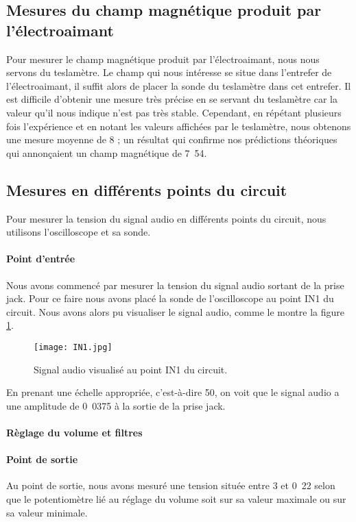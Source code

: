 \subsection{Mesures du champ magnétique produit par l'électroaimant}
Pour mesurer le champ magnétique produit par l'électroaimant, nous nous servons du teslamètre.
Le champ qui nous intéresse se situe dans l'entrefer de l'électroaimant, il suffit alors de placer
la sonde du teslamètre dans cet entrefer. Il est difficile d'obtenir une mesure très précise en se
servant du teslamètre car la valeur qu'il nous indique n'est pas très stable. Cependant, en répétant
plusieurs fois l'expérience et en notant les valeurs affichées par le teslamètre, nous obtenons une mesure
moyenne de \unit{8}{\centi\tesla} ; un résultat qui confirme nos prédictions théoriques
qui annonçaient un champ magnétique de \unit{7.54}{\centi\tesla}.

\subsection{Mesures en différents points du circuit}
Pour mesurer la tension du signal audio en différents points du circuit, nous utilisons l'oscilloscope
et sa sonde.

\paragraph{Point d'entrée}
Nous avons commencé par mesurer la tension du signal audio sortant de la prise jack. Pour ce faire nous avons
placé la sonde de l'oscilloscope au point IN1 du circuit. Nous avons alors pu visualiser le 
signal audio, comme le montre la figure \ref{in1}.

\begin{figure}[!htb]
	\centering
	\texttt{[image: IN1.jpg]}
	\caption{Signal audio visualisé au point IN1 du circuit.}
	\label{in1}
\end{figure}

En prenant une échelle appropriée, c'est-à-dire \unit{50}{\milli\volt}, on voit que le signal 
audio a une amplitude de \unit{0.0375}{\volt} à la sortie de la prise jack.

\paragraph{Règlage du volume et filtres}


\paragraph{Point de sortie}
Au point de sortie, nous avons mesuré une tension située entre \unit{3}{\volt}
et \unit{0.22}{\volt} selon que le potentiomètre lié au réglage du volume
soit sur sa valeur maximale ou sur sa valeur minimale.



